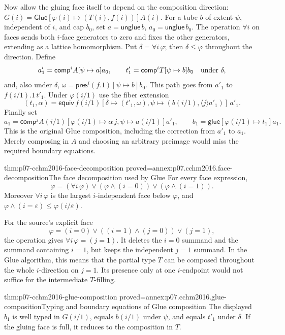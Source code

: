 Now allow the gluing face itself to depend on the composition
direction:
\(G(i)=\mathsf{Glue}[\varphi(i)\mapsto(T(i),f(i))]A(i)\).
For a tube \(b\) of extent \(\psi\), independent of \(i\), and cap
\(b_0\), set \(a=\mathsf{unglue}\,b\), \(a_0=\mathsf{unglue}\,b_0\).
The operation \(\forall i\) on faces sends both \(i\)-face generators
to zero and fixes the other generators, extending as a lattice
homomorphism.  Put \(\delta=\forall i\,\varphi\); then
\(\delta\leq\varphi\) throughout the direction.  Define
\[
 a'_1=\mathsf{comp}^{i}A[\psi\mapsto a]a_0,
 \qquad
 t'_1=\mathsf{comp}^{i}T[\psi\mapsto b]b_0
                     \quad\hbox{under }\delta ,
\]
and, also under \(\delta\),
\(\omega=\mathsf{pres}^{i}(f.1)[\psi\mapsto b]b_0\).
This path goes from \(a'_1\) to \(f(i/1).1\,t'_1\).
Under \(\varphi(i/1)\) use the fiber extension
\[
 (t_1,\alpha)=
 \mathsf{equiv}\,f(i/1)
 [\delta\mapsto(t'_1,\omega),
  \psi\mapsto(b(i/1),\langle j\rangle a'_1)]\,a'_1 .
\]
Finally set
\[
 a_1=\mathsf{comp}^{j}A(i/1)
       [\varphi(i/1)\mapsto\alpha\,j,\psi\mapsto a(i/1)]a'_1,
 \qquad
 b_1=\mathsf{glue}[\varphi(i/1)\mapsto t_1]a_1 .
\]
This is the original Glue composition, including the correction from
\(a'_1\) to \(a_1\).  Merely composing in \(A\) and choosing an
arbitrary preimage would miss the required boundary equations.

\begin{hblemma}{thm:p07-cchm2016-face-decomposition}
 {proved=annex:p07.cchm2016.face-decomposition}{The face decomposition used by Glue}
For every face expression,
\[
 \varphi=(\forall i\,\varphi)
       \vee(\varphi\wedge(i=0))\vee(\varphi\wedge(i=1)).
\]
Moreover \(\forall i\,\varphi\) is the largest \(i\)-independent face
below \(\varphi\), and
\(\varphi\wedge(i=\varepsilon)\leq\varphi(i/\varepsilon)\).
\end{hblemma}

For the source's explicit face
\[
 \varphi=(i=0)\vee((i=1)\wedge(j=0))\vee(j=1),
\]
the operation gives \(\forall i\,\varphi=(j=1)\).
It deletes the \(i=0\) summand and the summand containing \(i=1\),
but keeps the independent \(j=1\) summand.  In the Glue algorithm,
this means that the partial type \(T\) can be composed throughout
the whole \(i\)-direction on \(j=1\).  Its presence only at one
\(i\)-endpoint would not suffice for the intermediate \(T\)-filling.

\begin{hblemma}{thm:p07-cchm2016-glue-composition}
 {proved=annex:p07.cchm2016.glue-composition}{Typing and boundary equations of Glue composition}
The displayed \(b_1\) is well typed in \(G(i/1)\), equals \(b(i/1)\)
under \(\psi\), and equals \(t'_1\) under \(\delta\).  If the gluing
face is full, it reduces to the composition in \(T\).
\end{hblemma}

